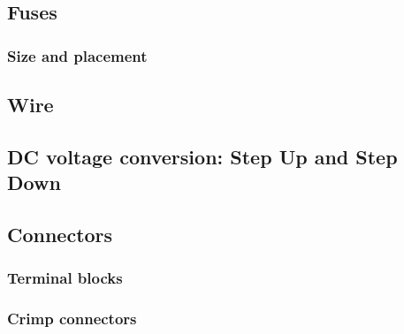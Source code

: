 \documentclass{article}
\theoremstyle{definition}
\theoremstyle{definition}
\theoremstyle{remark}
\begin{document}
  \subsection{Fuses} %
  \label{sub:fuses}
  
    \subsubsection{Size and placement} %
    \label{ssub:size_and_placement}
    


  \subsection{Wire} %
  \label{sub:wire}
  

  \subsection{DC voltage conversion: Step Up and Step Down} %
  \label{sub:dc_voltage_conversion_step_up_and_step_down}
  

  \subsection{Connectors} %
  \label{sub:connectors}
  
    \subsubsection{Terminal blocks} %
    \label{ssub:terminal_blocks}
    

    \subsubsection{Crimp connectors} %
    \label{ssub:crimp_connectors}
    


\end{document}
